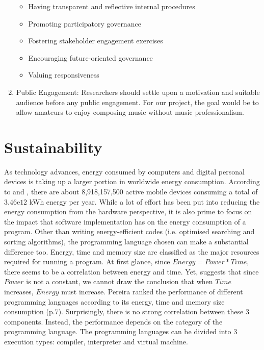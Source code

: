 \begin{enumerate}
\begin{itemize}
        \item Having transparent and reflective internal procedures
        \item Promoting participatory governance
        \item Fostering stakeholder engagement exercises
        \item Encouraging future-oriented governance
        \item Valuing responsiveness
    \end{itemize}
    \item Public Engagement: Researchers should settle upon a motivation and suitable audience before any public engagement. For our project, the goal would be to allow amateurs to enjoy composing music without
    music professionalism.
\end{enumerate}
\section{Sustainability}
\label{Sustainability}
As technology advances, energy consumed by computers and digital personal devices is taking up a larger portion in worldwide energy consumption. 
According to \cite{energy} and \cite{energypy}, there are about 8,918,157,500 active mobile devices consuming a total of $3.46\mathrm{e}{12}$ kWh energy per year.
While a lot of effort has been put into reducing the energy consumption from the hardware perspective,
it is also prime to focus on the impact that software implementation has on the energy consumption of a program.
Other than writing energy-efficient codes (i.e. optimised searching and sorting algorithms), the programming language 
chosen can make a substantial difference too. Energy, time and memory size are classified as the major resources required for running a program.
At first glance, since \(Energy = Power * Time\), there seems to be a correlation between energy and time. Yet,
\cite{energyplanguage} suggests that since \(Power\) is not a constant, we cannot draw the conclusion that
when \(Time\) increases, \(Energy\) must increase. 
Pereira ranked the performance of different programming languages according to its energy, time and memory size consumption (p.7). 
Surprisingly, there is no strong correlation between these 3 components. 
Instead, the performance depends on the category of the programming language.
The programming languages can be divided into 3 execution types: compiler, interpreter and virtual machine.

